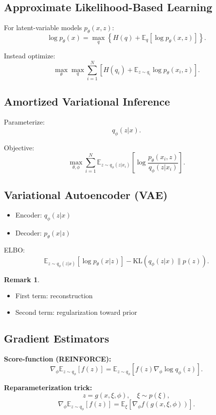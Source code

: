 \documentclass[12pt,oneside]{book}
\numberwithin{equation}{section}
\theoremstyle{definition}
\newtheorem{remark}{Remark}[section]
\theoremstyle{plain}
\theoremstyle{remark}
\newcommand{\E}{\mathbb{E}}
\begin{document}
\subsection{Approximate Likelihood-Based Learning}

For latent-variable models $p_\theta(x,z)$:
\[
\log p_\theta(x)
=
\max_q \left\{ H(q) + \E_q[\log p_\theta(x,z)] \right\}.
\]

Instead optimize:
\[
\max_\theta \max_q \sum_{i=1}^N \left[ H(q_i) + \E_{z \sim q_i} \log p_\theta(x_i,z) \right].
\]

\subsection{Amortized Variational Inference}

Parameterize:
\[
q_\phi(z|x).
\]

Objective:
\[
\max_{\theta,\phi} \sum_{i=1}^N \E_{z \sim q_\phi(z|x_i)} \left[
\log \frac{p_\theta(x_i,z)}{q_\phi(z|x_i)}
\right].
\]

\subsection{Variational Autoencoder (VAE)}

\begin{itemize}
    \item Encoder: $q_\phi(z|x)$
    \item Decoder: $p_\theta(x|z)$
\end{itemize}

ELBO:
\[
\E_{z \sim q_\phi(z|x)}[\log p_\theta(x|z)]
-
\mathrm{KL}(q_\phi(z|x) \| p(z)).
\]

\begin{remark}
\begin{itemize}
    \item First term: reconstruction
    \item Second term: regularization toward prior
\end{itemize}
\end{remark}

\subsection{Gradient Estimators}

\textbf{Score-function (REINFORCE):}
\[
\nabla_\phi \E_{z \sim q_\phi}[f(z)]
=
\E_{z \sim q_\phi}\left[ f(z)\nabla_\phi \log q_\phi(z) \right].
\]

\textbf{Reparameterization trick:}
\[
z = g(x,\xi,\phi), \quad \xi \sim p(\xi),
\]
\[
\nabla_\phi \E_{z \sim q_\phi}[f(z)]
=
\E_\xi[\nabla_\phi f(g(x,\xi,\phi))].
\]
\end{document}
